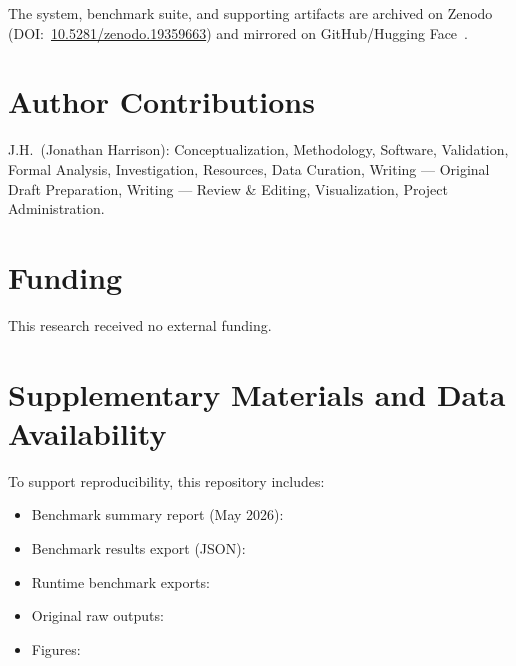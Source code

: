 \documentclass[11pt,a4paper]{article}
\begin{document}
The system, benchmark suite, and supporting artifacts are archived on Zenodo
(DOI:~\href{https://doi.org/10.5281/zenodo.19359663}{10.5281/zenodo.19359663})
and mirrored on GitHub/Hugging Face~\citep{harrison2026codettezenodo,%
codetteReasoningWiki,codetteTrainingLab,codetteTrainingLabHF,codetteReasoningHF}.

\section*{Author Contributions}

J.H.\ (Jonathan Harrison): Conceptualization, Methodology, Software,
Validation, Formal Analysis, Investigation, Resources, Data Curation, Writing
--- Original Draft Preparation, Writing --- Review \& Editing, Visualization,
Project Administration.

\section*{Funding}

This research received no external funding.

\appendix

\section{Supplementary Materials and Data Availability}
\label{app:data}

To support reproducibility, this repository includes:
{\sloppy
\begin{itemize}[leftmargin=*]
  \item Benchmark summary report (May 2026):
  \item Benchmark results export (JSON):
  \item Runtime benchmark exports:
  \item Original raw outputs: 
  \item Figures: 
\end{itemize}
}
\end{document}

